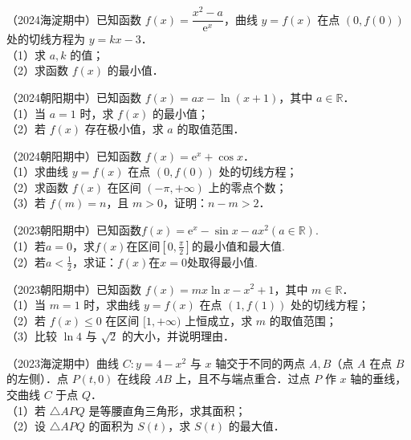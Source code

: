 \begin{example}
（2024海淀期中）已知函数 $f(x)=\dfrac{x^2-a}{\mathrm{e}^x}$，曲线 $y=f(x)$ 在点 $(0,f(0))$ 处的切线方程为 $y=kx-3$．\\
（1）求 $a,k$ 的值；\\
（2）求函数 $f(x)$ 的最小值．
\end{example}

\begin{example}
（2024朝阳期中）已知函数 $f(x)=ax-\ln(x+1)$，其中 $a\in\mathbb{R}$．\\
（1）当 $a=1$ 时，求 $f(x)$ 的最小值；\\
（2）若 $f(x)$ 存在极小值，求 $a$ 的取值范围．
\end{example}

\begin{example}
（2024朝阳期中）已知函数 $f(x)=\mathrm{e}^x+\cos x$．\\
（1）求曲线 $y=f(x)$ 在点 $(0,f(0))$ 处的切线方程；\\
（2）求函数 $f(x)$ 在区间 $(-\pi,+\infty)$ 上的零点个数；\\
（3）若 $f(m)=n$，且 $m>0$，证明：$n-m>2$．
\end{example}

\begin{example}
（2023朝阳期中）已知函数$f(x) = \mathrm{e}^x -\sin x  -ax^2 (a\in \mathbb{R})$.\\
（1）若$a = 0$，求$f(x)$在区间$[0, \frac{\pi}{2}]$的最小值和最大值.\\
（2）若$a < \frac{1}{2}$，求证：$f(x)$在$x = 0$处取得最小值.
\end{example}

\begin{example}
（2023朝阳期中）已知函数 $f(x)=mx\ln x-x^2+1$，其中 $m\in\mathbb{R}$．\\
（1）当 $m=1$ 时，求曲线 $y=f(x)$ 在点 $(1,f(1))$ 处的切线方程；\\
（2）若 $f(x)\leqslant 0$ 在区间 $[1,+\infty)$ 上恒成立，求 $m$ 的取值范围；\\
（3）比较 $\ln 4$ 与 $\sqrt{2}$ 的大小，并说明理由．
\end{example}

\begin{example}
（2023海淀期中）曲线 $C:y=4-x^2$ 与 $x$ 轴交于不同的两点 $A,B$（点 $A$ 在点 $B$ 的左侧）．点 $P(t,0)$ 在线段 $AB$ 上，且不与端点重合．过点 $P$ 作 $x$ 轴的垂线，交曲线 $C$ 于点 $Q$．\\
（1）若 $\triangle APQ$ 是等腰直角三角形，求其面积；\\
（2）设 $\triangle APQ$ 的面积为 $S(t)$，求 $S(t)$ 的最大值．
\end{example}

